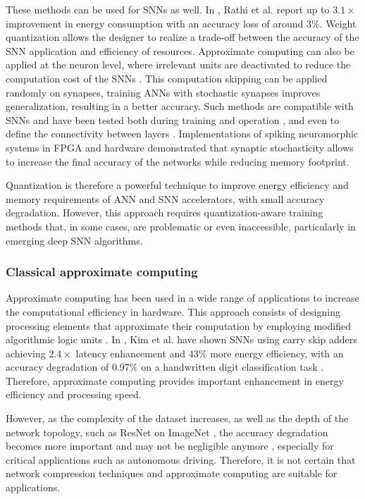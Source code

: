 These methods can be used for SNNs as well. In \cite{rathi2018stdp}, Rathi et al. report up to $3.1\times$ improvement in energy consumption with an accuracy loss of around $3\%$. Weight quantization allows the designer to realize a trade-off between the accuracy of the SNN application and efficiency of resources. Approximate computing can also be applied at the neuron level, where irrelevant units are deactivated to reduce the computation cost of the SNNs \cite{sen2017approximate}. This computation skipping can be applied randomly on synapses, training ANNs with stochastic synapses improves generalization, resulting in a better accuracy\cite{srivastava2014dropout, wan2013regularization}. Such methods are compatible with SNNs and have been tested both during training \cite{neftci2016stochastic, srinivasan2016magnetic} and operation \cite{buesing2011neural}, and even to define the connectivity between layers \cite{bellec2017deep, chen20184096}. Implementations of spiking neuromorphic systems in FPGA \cite{sheik2016synaptic} and hardware \cite{jerry2017ultra} demonstrated that synaptic stochasticity allows to increase the final accuracy of the networks while reducing memory footprint.

Quantization is therefore a powerful technique to improve energy efficiency and memory requirements of ANN and SNN accelerators, with small accuracy degradation. However, this approach requires quantization-aware training methods that, in some cases, are problematic or even inaccessible, particularly in emerging deep SNN algorithms\cite{zhang2018survey}.

\subsubsection{Classical approximate computing}
Approximate computing has been used in a wide range of applications to increase the computational efficiency in hardware\cite{han2013approximate}. This approach consists of designing processing elements that approximate their computation by employing modified algorithmic logic units \cite{han2013approximate}. In \cite{kim2013energy}, Kim et al. have shown SNNs using carry skip adders achieving $2.4\times$ latency enhancement and $43\%$ more energy efficiency, with an accuracy degradation of 0.97\% on a handwritten digit classification task . Therefore, approximate computing provides important enhancement in energy efficiency and processing speed.

However, as the complexity of the dataset increases, as well as the depth of the network topology, such as ResNet \cite{he2016deep} on ImageNet \cite{russakovsky2015imagenet}, the accuracy degradation becomes more important and may not be negligible anymore \cite{rastegari2016xnor}, especially for critical applications such as autonomous driving. Therefore, it is not certain that network compression techniques and approximate computing are suitable for  applications.

